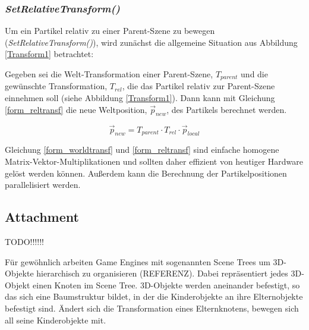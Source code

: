 \subsubsection{\textit{SetRelativeTransform()}}

Um ein Partikel relativ zu einer Parent-Szene zu bewegen (\textit{SetRelativeTransform()}), wird zunächst die allgemeine Situation aus Abbildung \ref{Transform1} betrachtet:


Gegeben sei die Welt-Transformation einer Parent-Szene, $T_{parent}$ und die gewünschte Transformation, $T_{rel}$, die das Partikel relativ zur Parent-Szene einnehmen soll (siehe Abbildung \ref{Transform1}). Dann kann mit Gleichung \ref{form_reltransf} die neue Weltposition, $\vec{p}_{new}$, des Partikels berechnet werden.

\begin{equation}
\vec{p}_{new} = T_{parent} \cdot T_{rel} \cdot \vec{p}_{local}
\label{form_reltransf}
\end{equation}

Gleichung \ref{form_worldtransf} und \ref{form_reltransf} sind einfache homogene Matrix-Vektor-Multiplikationen und sollten daher effizient von heutiger Hardware gelöst werden können. Außerdem kann die Berechnung der Partikelpositionen parallelisiert werden.

\subsection{Attachment}




TODO!!!!!!

Für gewöhnlich arbeiten Game Engines mit sogenannten Scene Trees um 3D-Objekte hierarchisch zu organisieren (REFERENZ). Dabei repräsentiert jedes 3D-Objekt einen Knoten im Scene Tree. 3D-Objekte werden aneinander befestigt, so das sich eine Baumstruktur bildet, in der die Kinderobjekte an ihre Elternobjekte befestigt sind. Ändert sich die Transformation eines Elternknotens, bewegen sich all seine Kinderobjekte mit. 

